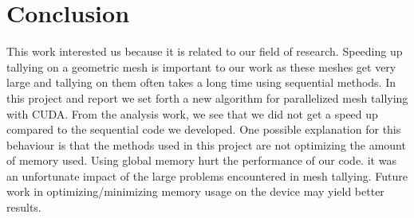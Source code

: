 \section{Conclusion}
This work interested us because it is related to our field of 
research. Speeding up tallying on a geometric mesh is important to our work 
as these meshes get very large and tallying on them often takes a long time
using sequential methods. In this project and report we set
forth a new algorithm for parallelized mesh tallying with CUDA. 
From the analysis work, we see that we did not get a speed up compared 
to the sequential code we developed. One possible explanation for this 
behaviour is that the methods used in this project are not optimizing 
the amount of memory used. Using global memory hurt the performance of our code.
it was an unfortunate impact of the large problems encountered in mesh tallying.
Future work in optimizing/minimizing memory usage on the device may yield
better results.
